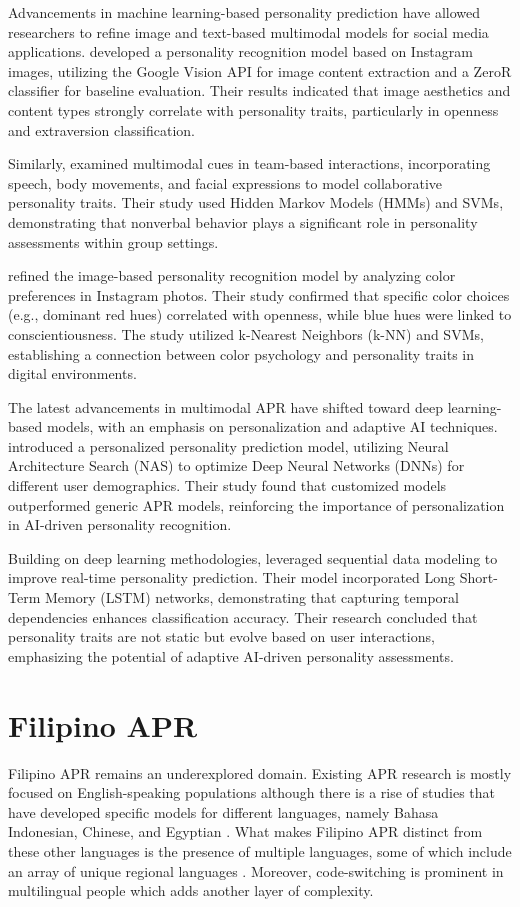 Advancements in machine learning-based personality prediction have allowed researchers to refine image and text-based multimodal models for social media applications. \citet{Ferwerda2018} developed a personality recognition model based on Instagram images, utilizing the Google Vision API for image content extraction and a ZeroR classifier for baseline evaluation. Their results indicated that image aesthetics and content types strongly correlate with personality traits, particularly in openness and extraversion classification.

Similarly, \citet{Batrinca2016} examined multimodal cues in team-based interactions, incorporating speech, body movements, and facial expressions to model collaborative personality traits. Their study used Hidden Markov Models (HMMs) and SVMs, demonstrating that nonverbal behavior plays a significant role in personality assessments within group settings.

\citet{Branz2020} refined the image-based personality recognition model by analyzing color preferences in Instagram photos. Their study confirmed that specific color choices (e.g., dominant red hues) correlated with openness, while blue hues were linked to conscientiousness. The study utilized k-Nearest Neighbors (k-NN) and SVMs, establishing a connection between color psychology and personality traits in digital environments.

The latest advancements in multimodal APR have shifted toward deep learning-based models, with an emphasis on personalization and adaptive AI techniques. \citet{Salam2022} introduced a personalized personality prediction model, utilizing Neural Architecture Search (NAS) to optimize Deep Neural Networks (DNNs) for different user demographics. Their study found that customized models outperformed generic APR models, reinforcing the importance of personalization in AI-driven personality recognition.

Building on deep learning methodologies, \citet{Lima2022} leveraged sequential data modeling to improve real-time personality prediction. Their model incorporated Long Short-Term Memory (LSTM) networks, demonstrating that capturing temporal dependencies enhances classification accuracy. Their research concluded that personality traits are not static but evolve based on user interactions, emphasizing the potential of adaptive AI-driven personality assessments.


\section{Filipino APR}
\label{sec: FilipinoAPR}
Filipino APR remains an underexplored domain. Existing APR research is mostly focused on English-speaking populations although there is a rise of studies that have developed specific models for different languages, namely Bahasa Indonesian, Chinese, and Egyptian \citep{Siddique2019, Salem2019, Adi2018}. What makes Filipino APR distinct from these other languages is the presence of multiple languages, some of which include an array of unique regional languages \citep{Tighe_Acorda_Agno_Gano_Go_Santiago_Sedillo_2022,tighe_modeling_2018}. Moreover, code-switching is prominent in multilingual people which adds another layer of complexity.

